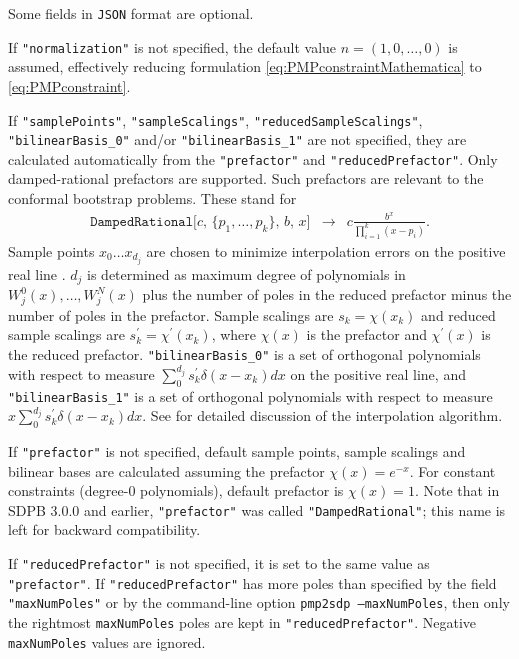 \documentclass[12pt]{article}
\numberwithin{equation}{section}
\renewcommand{\be}{\begin{eqnarray}}
\renewcommand{\ee}{\end{eqnarray}}
\begin{document}
Some fields in \texttt{JSON} format are optional.

If \texttt{"normalization"} is not specified, the default value $n=(1,0,\ldots,0)$ is assumed, effectively reducing formulation \eqref{eq:PMPconstraintMathematica} to \eqref{eq:PMPconstraint}.

If \texttt{"samplePoints"}, \texttt{"sampleScalings"}, \texttt{"reducedSampleScalings"}, \texttt{"bilinearBasis\_0"} and/or  \texttt{"bilinearBasis\_1"} are not specified,
they are calculated automatically from the \texttt{"prefactor"} and \texttt{"reducedPrefactor"}.
Only damped-rational prefactors are supported.
Such prefactors are relevant to the conformal bootstrap problems.
These stand for
\be
\texttt{DampedRational[$c$, \{$p_1,\dots,p_k$\}, $b$, $x$]} &\to& c\frac{b^x}{\prod_{i=1}^k (x-p_i)}.
\ee
Sample points $x_0 \ldots x_{d_j}$ are chosen to minimize interpolation errors on the positive real line \cite{Chang:2025mwt}.
$d_j$ is determined as maximum degree of polynomials in $W^0_j(x),\dots,W^N_j(x)$ plus the number of poles in the reduced prefactor minus the number of poles in the prefactor.
Sample scalings are $s_k = \chi(x_k)$ and reduced sample scalings are $s^\prime_k = \chi^\prime(x_k)$,
where $\chi(x)$ is the prefactor and $\chi^\prime(x)$ is the reduced prefactor.
\texttt{"bilinearBasis\_0"} is a set of orthogonal polynomials with respect to measure $\sum_{0}^{d_j}s^\prime_k \delta(x-x_k)dx$ on the positive real line, and \texttt{"bilinearBasis\_1"} is a set of orthogonal polynomials with respect to measure $x\sum_{0}^{d_j}s^\prime_k \delta(x-x_k)dx$.
See \cite{Chang:2025mwt} for detailed discussion of the interpolation algorithm.

If \texttt{"prefactor"} is not specified, default sample points, sample scalings and bilinear bases are calculated assuming the prefactor $\chi(x) = e^{-x}$. For constant constraints (degree-0 polynomials), default prefactor is $\chi(x) = 1$.
Note that in SDPB 3.0.0 and earlier, \texttt{"prefactor"} was called \texttt{"DampedRational"}; this name is left for backward compatibility.

If \texttt{"reducedPrefactor"} is not specified, it is set to the same value as \texttt{"prefactor"}.
If \texttt{"reducedPrefactor"} has more poles than specified by the field \texttt{"maxNumPoles"} or by the command-line option \texttt{pmp2sdp --maxNumPoles}, then only the rightmost \texttt{maxNumPoles} poles are kept in \texttt{"reducedPrefactor"}.
Negative \texttt{maxNumPoles} values are ignored.
\end{document}
